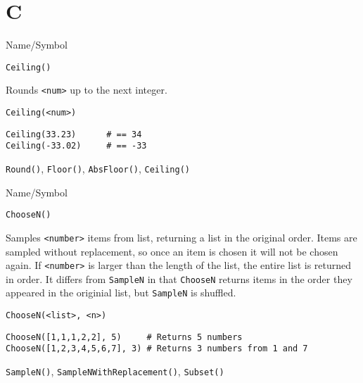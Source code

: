 \rl


\section{C}
\rl


\begin{desc}{Name/Symbol}
\item[Name/Symbol]  	\verb+Ceiling()+

\item[Description] 	Rounds \verb+<num>+ up to the next integer.

\item[Usage]
\begin{verbatim}
Ceiling(<num>)
\end{verbatim}

\item[Example] 
\begin{verbatim}
Ceiling(33.23)  	# == 34
Ceiling(-33.02) 	# == -33
\end{verbatim}

\item[See Also]     	\verb+Round()+, \verb+Floor()+, \verb+AbsFloor()+, \verb+Ceiling()+
\end{desc}

\rl

\begin{desc}{Name/Symbol}
\item[Name/Symbol]  	\verb+ChooseN()+

\item[Description] Samples \verb+<number>+ items from list, returning
  a list in the original order. Items are sampled without replacement, so
  once an item is chosen it will not be chosen again. If
  \verb+<number>+ is larger than the length of the list, the entire
  list is returned in order.  It differs from \verb+SampleN+ in that
  \verb+ChooseN+ returns items in the order they appeared in the
  originial list, but \verb+SampleN+ is shuffled. 

\item[Usage]       	
\begin{verbatim}
ChooseN(<list>, <n>)
\end{verbatim}

\item[Example]   	
\begin{verbatim}
ChooseN([1,1,1,2,2], 5)     # Returns 5 numbers
ChooseN([1,2,3,4,5,6,7], 3) # Returns 3 numbers from 1 and 7
\end{verbatim}

\item[See Also]    	\verb+SampleN()+, \verb+SampleNWithReplacement()+, \verb+Subset()+
\end{desc}

